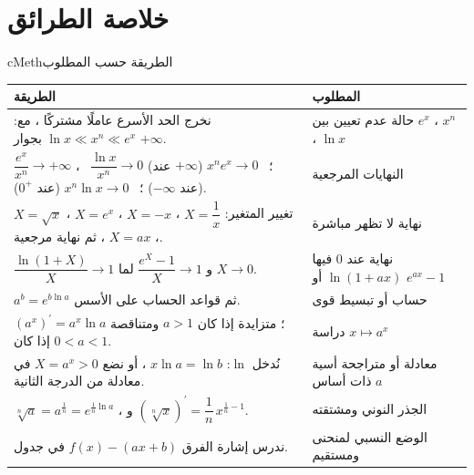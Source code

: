 \documentclass[12pt,a4paper]{article}
\newenvironment{BOX}[2]{\begin{otherlanguage}{english}\begin{arbox}{#1}{#2}}{\end{arbox}\end{otherlanguage}}
\begin{document}
\section{خلاصة الطرائق}
\begin{BOX}{cMeth}{الطريقة حسب المطلوب}
\begin{center}
\renewcommand{\arraystretch}{1.5}
\begin{tabular}{|p{}|p{}|}\hline
\rowcolor{cSec!12} \textbf{الطريقة} & \textbf{المطلوب}\\\hline
نخرج الحد الأسرع عاملًا مشتركًا ، مع: $\ln x\ll x^n\ll e^x$ بجوار $+\infty$. & حالة عدم تعيين بين $e^x$ ، $x^n$ ، $\ln x$\\\hline
$\dfrac{e^x}{x^n}\to+\infty$ ، \ $\dfrac{\ln x}{x^n}\to0$ (عند $+\infty$) ؛ \ $x^ne^x\to0$ (عند $-\infty$) ؛ \ $x^n\ln x\to0$ (عند $0^+$). & النهايات المرجعية\\\hline
تغيير المتغير: $X=\dfrac1x$ ، $X=-x$ ، $X=e^x$ ، $X=\sqrt x$ ، $X=ax$ ، ثم نهاية مرجعية. & نهاية لا تظهر مباشرة\\\hline
$\dfrac{\ln(1+X)}X\to1$ و $\dfrac{e^X-1}X\to1$ لما $X\to0$. & نهاية عند $0$ فيها $\ln(1+ax)$ أو $e^{ax}-1$\\\hline
$a^b=e^{b\ln a}$ ثم قواعد الحساب على الأسس. & حساب أو تبسيط قوى\\\hline
$\left(a^x\right)^{\prime}=a^x\ln a$ ؛ متزايدة إذا كان $a>1$ ومتناقصة إذا كان $0<a<1$. & دراسة $x\mapsto a^x$\\\hline
نُدخل $\ln$: $x\ln a=\ln b$ ، أو نضع $X=a^x>0$ في معادلة من الدرجة الثانية. & معادلة أو متراجحة أسية ذات أساس $a$\\\hline
$\sqrt[n]a=a^{\frac1n}=e^{\frac1n\ln a}$ ، و $\left(\sqrt[n]x\right)^{\prime}=\dfrac1n\,x^{\frac1n-1}$. & الجذر النوني ومشتقته\\\hline
ندرس إشارة الفرق $f(x)-(ax+b)$ في جدول. & الوضع النسبي لمنحنى ومستقيم\\\hline
\end{tabular}
\end{center}
\end{BOX}
\end{document}

